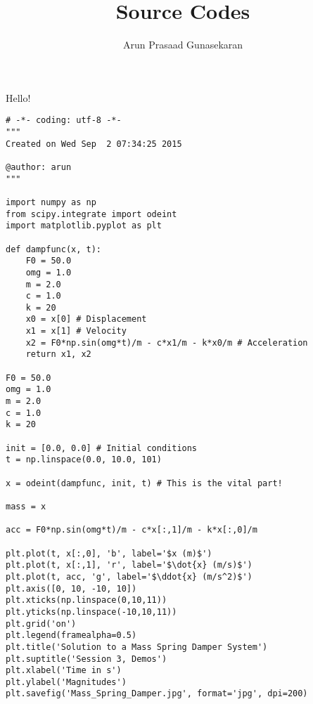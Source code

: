 \documentclass[10pt,a4paper]{article}
\author{Arun Prasaad Gunasekaran}
\title{Source Codes}
\begin{document}
\maketitle
Hello!

\begin{verbatim}
# -*- coding: utf-8 -*-
"""
Created on Wed Sep  2 07:34:25 2015

@author: arun
"""

import numpy as np
from scipy.integrate import odeint
import matplotlib.pyplot as plt

def dampfunc(x, t):
    F0 = 50.0
    omg = 1.0
    m = 2.0
    c = 1.0
    k = 20
    x0 = x[0] # Displacement
    x1 = x[1] # Velocity
    x2 = F0*np.sin(omg*t)/m - c*x1/m - k*x0/m # Acceleration
    return x1, x2

F0 = 50.0
omg = 1.0
m = 2.0
c = 1.0
k = 20

init = [0.0, 0.0] # Initial conditions
t = np.linspace(0.0, 10.0, 101)

x = odeint(dampfunc, init, t) # This is the vital part!

mass = x

acc = F0*np.sin(omg*t)/m - c*x[:,1]/m - k*x[:,0]/m

plt.plot(t, x[:,0], 'b', label='$x (m)$')
plt.plot(t, x[:,1], 'r', label='$\dot{x} (m/s)$')
plt.plot(t, acc, 'g', label='$\ddot{x} (m/s^2)$')
plt.axis([0, 10, -10, 10])
plt.xticks(np.linspace(0,10,11))
plt.yticks(np.linspace(-10,10,11))
plt.grid('on')
plt.legend(framealpha=0.5)
plt.title('Solution to a Mass Spring Damper System')
plt.suptitle('Session 3, Demos')
plt.xlabel('Time in s')
plt.ylabel('Magnitudes')
plt.savefig('Mass_Spring_Damper.jpg', format='jpg', dpi=200)
\end{verbatim}
\end{document}
